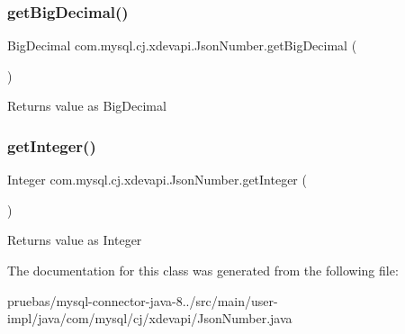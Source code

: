 \subsubsection{\texorpdfstring{get\+Big\+Decimal()}{getBigDecimal()}}
{\footnotesize\ttfamily Big\+Decimal com.\+mysql.\+cj.\+xdevapi.\+Json\+Number.\+get\+Big\+Decimal (\begin{DoxyParamCaption}{ }\end{DoxyParamCaption})}

\begin{DoxyReturn}{Returns}
value as Big\+Decimal 
\end{DoxyReturn}
\mbox{\label{classcom_1_1mysql_1_1cj_1_1xdevapi_1_1_json_number_a3e58ec83a320dff5e31a56db7f8daec1}} 
\subsubsection{\texorpdfstring{get\+Integer()}{getInteger()}}
{\footnotesize\ttfamily Integer com.\+mysql.\+cj.\+xdevapi.\+Json\+Number.\+get\+Integer (\begin{DoxyParamCaption}{ }\end{DoxyParamCaption})}

\begin{DoxyReturn}{Returns}
value as Integer 
\end{DoxyReturn}


The documentation for this class was generated from the following file\+:\begin{DoxyCompactItemize}
\item 
pruebas/mysql-\/connector-\/java-\/8../src/main/user-\/impl/java/com/mysql/cj/xdevapi/Json\+Number.\+java\end{DoxyCompactItemize}

